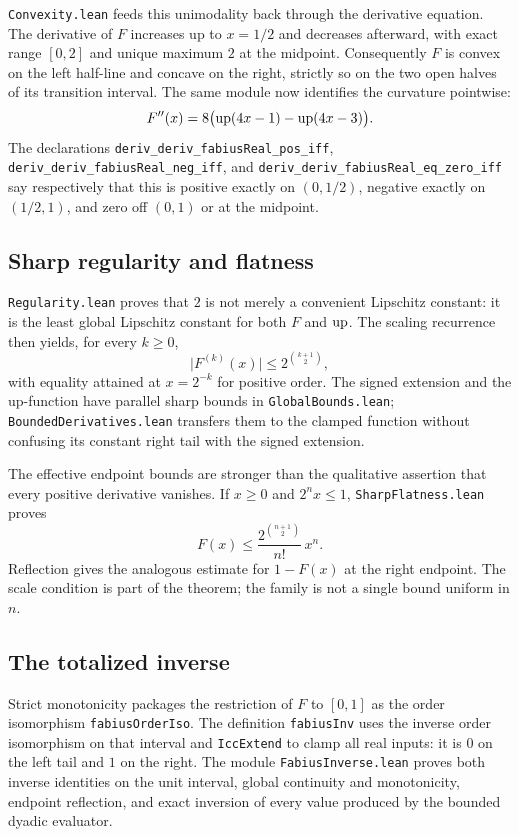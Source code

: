 \documentclass[11pt,oneside]{article}
\theoremstyle{definition}
\theoremstyle{remark}
\begin{document}
\nolinkurl{Convexity.lean} feeds this unimodality back through the derivative
equation.  The derivative of \(F\) increases up to \(x=1/2\) and decreases
afterward, with exact range \([0,2]\) and unique maximum \(2\) at the
midpoint.  Consequently \(F\) is convex on the left half-line and concave on
the right, strictly so on the two open halves of its transition interval.
The same module now identifies the curvature pointwise:
\[
  F''(x)=8\bigl(\operatorname{up}(4x-1)-\operatorname{up}(4x-3)\bigr).
\]
The declarations \nolinkurl{deriv_deriv_fabiusReal_pos_iff},
\nolinkurl{deriv_deriv_fabiusReal_neg_iff}, and
\nolinkurl{deriv_deriv_fabiusReal_eq_zero_iff} say respectively that this is
positive exactly on \((0,1/2)\), negative exactly on \((1/2,1)\), and zero
off \((0,1)\) or at the midpoint.

\subsection{Sharp regularity and flatness}
\nolinkurl{Regularity.lean} proves that \(2\) is not merely a convenient Lipschitz
constant: it is the least global Lipschitz constant for both \(F\) and
\(\operatorname{up}\).  The scaling recurrence then yields, for every \(k\geq0\),
\[
  \bigl|F^{(k)}(x)\bigr|\leq 2^{\binom{k+1}{2}},
\]
with equality attained at \(x=2^{-k}\) for positive order.  The signed
extension and the up-function have parallel sharp bounds in
\nolinkurl{GlobalBounds.lean}; \nolinkurl{BoundedDerivatives.lean} transfers them to
the clamped function without confusing its constant right tail with the
signed extension.

The effective endpoint bounds are stronger than the qualitative assertion
that every positive derivative vanishes.  If \(x\geq0\) and \(2^n x\leq1\),
\nolinkurl{SharpFlatness.lean} proves
\[
  F(x)\leq \frac{2^{\binom{n+1}{2}}}{n!}\,x^n.
\]
Reflection gives the analogous estimate for \(1-F(x)\) at the right endpoint.
The scale condition is part of the theorem; the family is not a single bound
uniform in \(n\).

\subsection{The totalized inverse}
Strict monotonicity packages the restriction of \(F\) to \([0,1]\) as the
order isomorphism \nolinkurl{fabiusOrderIso}.  The definition \nolinkurl{fabiusInv}
uses the inverse order isomorphism on that interval and \nolinkurl{IccExtend} to
clamp all real inputs: it is \(0\) on the left tail and \(1\) on the right.
The module \nolinkurl{FabiusInverse.lean} proves both inverse identities on the unit
interval, global continuity and monotonicity, endpoint reflection, and exact
inversion of every value produced by the bounded dyadic evaluator.
\end{document}
